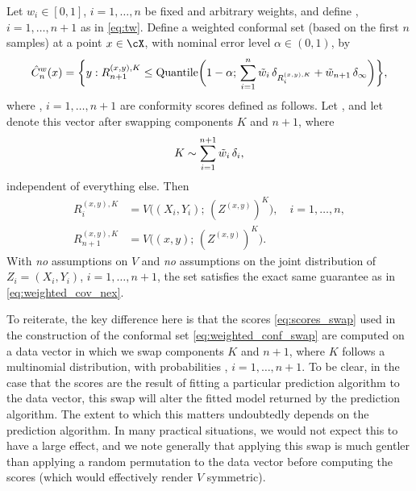 \documentclass{article}
\begin{document}
\begin{theorem}
\label{thm:weighted_conf_swap}
Let $w_i \in [0,1]$, $i=1,\dots,n$ be fixed and arbitrary weights, and define
, $i=1,\dots,n+1$ as in \eqref{eq:tw}. Define a weighted
conformal set (based on the first $n$ samples) at a point $x \in \cX$, with
nominal error level $\alpha \in (0,1)$, by    
\begin{equation}
\label{eq:weighted_conf_swap}
\hat{C}^w_n(x) = \bigg\{ y : R_{n+1}^{(x,y),K} \leq \mathrm{Quantile}\bigg( 1-\alpha;  
\, \sum_{i=1}^n \tilde{w}_i \, \delta_{R_i^{(x,y),K}} + \tilde{w}_{n+1} \, \delta_\infty 
\bigg) \bigg\},   
\end{equation}
where , $i=1,\ldots,n+1$ are conformity scores defined as
follows. Let , and let
 denote this vector after swapping components $K$ and  
$n+1$, where
\[
K \sim \sum_{i=1}^{n+1} \tilde{w}_i \, \delta_i,
\]
independent of everything else. Then 
\begin{equation}
\label{eq:scores_swap}
\begin{aligned}
R_i^{(x,y),K} &= V\Big( (X_i,Y_i); \, (Z^{(x,y)})^K \Big), \quad 
i=1,\dots,n, \\ 
R_{n+1}^{(x,y),K} &= V\Big( (x,y); \, (Z^{(x,y)})^K \Big).
\end{aligned}
\end{equation}
With \emph{no} assumptions on $V$ and \emph{no} assumptions on the joint
distribution of $Z_i=(X_i,Y_i)$, $i=1,\dots,n+1$, the set 
satisfies the exact same guarantee as in \eqref{eq:weighted_cov_nex}. 
\end{theorem}

To reiterate, the key difference here is that the scores \eqref{eq:scores_swap}
used in the construction of the conformal set \eqref{eq:weighted_conf_swap} are
computed on a data vector in which we swap components $K$ and $n+1$, where $K$
follows a multinomial distribution, with probabilities ,
$i=1,\dots,n+1$. To be clear, in the case that the scores are the result of
fitting a particular prediction algorithm to the data vector, this swap will
alter the fitted model returned by the prediction algorithm. The extent to which
this matters undoubtedly depends on the prediction algorithm. In many practical
situations, we would not expect this to have a large effect, and we note
generally that applying this swap is much gentler than applying a random
permutation to the data vector before computing the scores (which would
effectively render $V$ symmetric).
\end{document}

